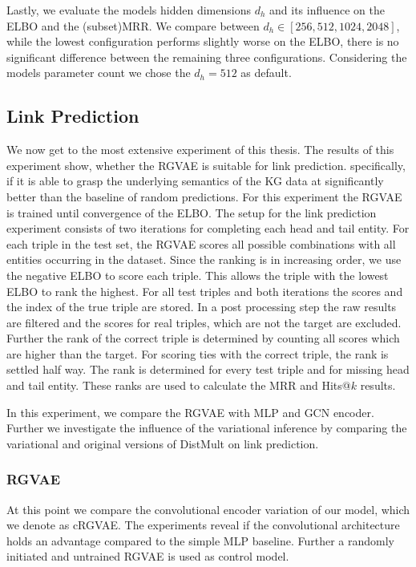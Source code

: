 Lastly, we evaluate the models hidden dimensions $d_h$ and its influence on the ELBO and the (subset)MRR. We compare between $d_h\in [256, 512, 1024, 2048]$, while the lowest configuration performs slightly worse on the ELBO, there is no significant difference between the remaining three configurations. Considering the models parameter count we chose the $d_h=512$ as default.


\subsection{Link Prediction}


We now get to the most extensive experiment of this thesis. The results of this experiment show, whether the RGVAE is suitable for link prediction. specifically, if it is able to grasp the underlying semantics of the KG data at significantly better than the baseline of random predictions. 
For this experiment the RGVAE is trained until convergence of the ELBO. The setup for the link prediction experiment consists of two iterations for completing each head and tail entity. For each triple in the test set, the RGVAE scores all possible combinations with all entities occurring in the dataset. Since the ranking is in increasing order, we use the negative ELBO to score each triple. This allows the triple with the lowest ELBO to rank the highest. For all test triples and both iterations the scores and the index of the true triple are stored. In a post processing step the raw results are filtered and the scores for real triples, which are not the target are excluded. Further the rank of the correct triple is determined by counting all scores which are higher than the target. For scoring ties with the correct triple, the rank is settled half way. The rank is determined for every test triple and for missing head and tail entity. These ranks are used to calculate the MRR and Hits@$k$ results. 
 
In this experiment, we compare the RGVAE with MLP and GCN encoder. Further we investigate the influence of the variational inference by comparing the variational and original versions of DistMult on link prediction.

\subsubsection{RGVAE}

At this point we compare the convolutional encoder variation of our model, which we denote as cRGVAE. The experiments reveal if the convolutional architecture holds an advantage compared to the simple MLP baseline. Further a randomly initiated and untrained RGVAE is used as control model.

